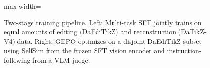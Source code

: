 \begin{figure}[t]
\begin{adjustbox}{max width=\textwidth}
\end{adjustbox}

\caption{Two-stage training pipeline. Left: Multi-task SFT jointly trains on equal amounts of editing (DaEdiTikZ) and reconstruction (DaTikZ-V4) data. Right: GDPO optimizes on a disjoint DaEdiTikZ subset using SelfSim from the frozen SFT vision encoder and instruction-following from a VLM judge.}
\label{fig:method_figure}

\end{figure}